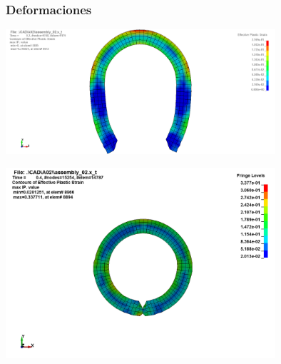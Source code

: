 \subsubsection{Deformaciones}

\begin{center}
\includegraphics[width=0.75\textwidth]{src/ch4/efective_plastic_strain_01.png}
\label{fig:efective_plastic_strain}
\end{center}




\begin{center}
\includegraphics[width=0.75\textwidth]{src/ch4/efective_plastic_strain_02.png}
\label{fig:efective_plastic_strain}
\end{center}

